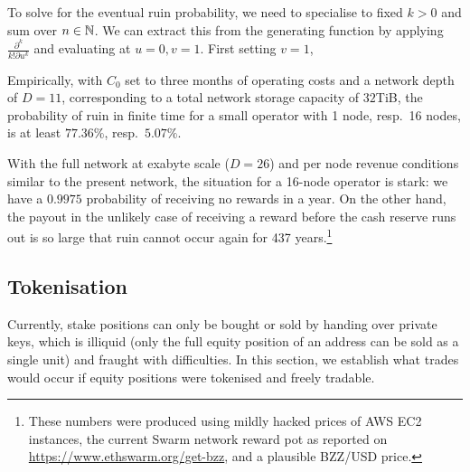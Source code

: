 To solve for the eventual ruin probability, we need to specialise to fixed $k>0$ and sum over $n\in\mathbb{N}$.
%
We can extract this from the generating function by applying $\frac{\partial^k}{k!\partial u^k}$ and evaluating at $u=0,v=1$.
%
First setting $v=1$,



\begin{example}

Empirically, with $C_0$ set to three months of operating costs and a network depth of $D=11$, corresponding to a total network storage capacity of $32$TiB, the probability of ruin in finite time for a small operator with 1 node, resp.~16 nodes, is at least $77.36\%$, resp.~$5.07\%$.
    
With the full network at exabyte scale ($D=26$) and per node revenue conditions similar to the present network, the situation for a 16-node operator is stark: we have a $0.9975$ probability of receiving no rewards in a year.
%
On the other hand, the payout in the unlikely case of receiving a reward before the cash reserve runs out is so large that ruin cannot occur again for 437 years.\footnote{These numbers were produced using mildly hacked prices of AWS EC2 instances, the current Swarm network reward pot as reported on \url{https://www.ethswarm.org/get-bzz}, and a plausible BZZ/USD price.}

\end{example}

\subsection{Tokenisation}

Currently, stake positions can only be bought or sold by handing over private keys, which is illiquid (only the full equity position of an address can be sold as a single unit) and fraught with difficulties.
%
In this section, we establish what trades would occur if equity positions were tokenised and freely tradable.

